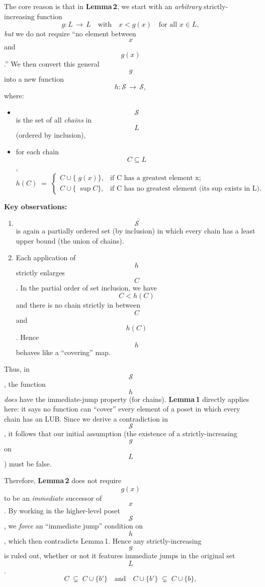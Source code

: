 \documentclass[12pt]{article}
\theoremstyle{definition} %
\theoremstyle{plain} %
\begin{document}
The core reason is that in \textbf{Lemma\,2}, we start with an \emph{arbitrary}
strictly-increasing function 
\[
   g : L \,\longrightarrow\, L 
   \quad\text{with}\quad 
   x < g(x)\quad\text{for all }x\in L,
\]
\emph{but} we do not require ``no element between $$x$$ and $$g(x)$$.'' 
We then convert this general $$g$$ into a new function 
\[
   h : \mathcal{S} \,\longrightarrow\, \mathcal{S},
\]
where:
\begin{itemize}
\item $$\mathcal{S}$$ is the set of all \emph{chains} in $$L$$ (ordered by inclusion),
\item for each chain $$C\subseteq L$$, 
\[
   h(C)\;=\;
   \begin{cases}
     C \cup \{\;g(x)\}, & \text{if $$C$$ has a greatest element $$x$$;}\\
     C \cup \{\;\sup C\}, & \text{if $$C$$ has no greatest element (its sup exists in $$L$$).}
   \end{cases}
\]
\end{itemize}

\medskip

\noindent
\textbf{Key observations:}
\begin{enumerate}
\item $$\mathcal{S}$$ is again a partially ordered set (by inclusion) in which
every chain has a least upper bound (the union of chains).
\item Each application of $$h$$ strictly enlarges $$C$$. In the partial order
of set inclusion, we have $$C < h(C)$$ and there is no chain strictly in
between $$C$$ and $$h(C)$$. Hence $$h$$ behaves like a ``covering'' map.
\end{enumerate}

Thus, in $$\mathcal{S}$$, the function $$h$$ \emph{does} have the immediate-jump property
(for chains). \textbf{Lemma\,1} directly applies here: it says no function can
``cover'' every element of a poset in which every chain has an LUB. 
Since we derive a contradiction in $$\mathcal{S}$$, it follows that our initial
assumption (the existence of a strictly-increasing $$g$$ on $$L$$) must be false.

\medskip

Therefore, \textbf{Lemma\,2} does not require $$g(x)$$ to be an
\emph{immediate} successor of $$x$$. By working in the higher-level poset
$$\mathcal{S}$$, we \emph{force} an ``immediate jump'' condition on $$h$$, 
which then contradicts Lemma\,1. Hence any strictly-increasing $$g$$ is ruled out, 
whether or not it features immediate jumps in the original set $$L$$.
\[
C \;\subsetneq\; C\cup\{b{\prime}\}
\quad\text{and}\quad
C\cup\{b{\prime}\} \;\subsetneq\; C\cup\{b\},
\]
\end{document}
